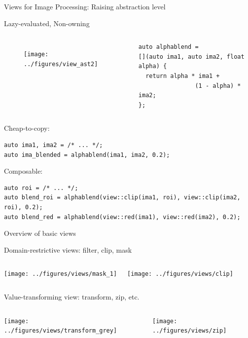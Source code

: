 \documentclass[12pt,aspectratio=169]{beamer}
\begin{document}
\begin{frame}[fragile]{Views for Image Processing: Raising abstraction level}
  \begin{alertblock}{Lazy-evaluated, Non-owning}
    \begin{columns}[T,onlytextwidth]
      \centering
      \begin{figure}
        \texttt{[image: ../figures/view\_ast2]}
      \end{figure}

      \begin{verbatim}
auto alphablend =
[](auto ima1, auto ima2, float alpha) {
  return alpha * ima1 +
                (1 - alpha) * ima2;
};
  \end{verbatim}
    \end{columns}
  \end{alertblock}

  \begin{alertblock}{Cheap-to-copy:}
    \begin{verbatim}
auto ima1, ima2 = /* ... */;
auto ima_blended = alphablend(ima1, ima2, 0.2);
    \end{verbatim}
  \end{alertblock}

  \begin{alertblock}{Composable:}
    \begin{verbatim}
auto roi = /* ... */;
auto blend_roi = alphablend(view::clip(ima1, roi), view::clip(ima2, roi), 0.2);
auto blend_red = alphablend(view::red(ima1), view::red(ima2), 0.2);
    \end{verbatim}
  \end{alertblock}

\end{frame}

\begin{frame}[fragile]{Overview of basic views}
  \begin{alertblock}{Domain-restrictive views: filter, clip, mask}
    \begin{columns}[T,onlytextwidth]
      \vspace{0.5cm}
      \texttt{[image: ../figures/views/mask\_1]}

      \vspace{0.5cm}
      \texttt{[image: ../figures/views/clip]}
    \end{columns}
  \end{alertblock}

  \begin{alertblock}{Value-transforming view: transform, zip, etc.}
    \begin{columns}[T,onlytextwidth]
      \vspace{0.5cm}
      \texttt{[image: ../figures/views/transform\_grey]}

      \vspace{0.5cm}
      \texttt{[image: ../figures/views/zip]}
    \end{columns}
  \end{alertblock}
\end{frame}
\end{document}
